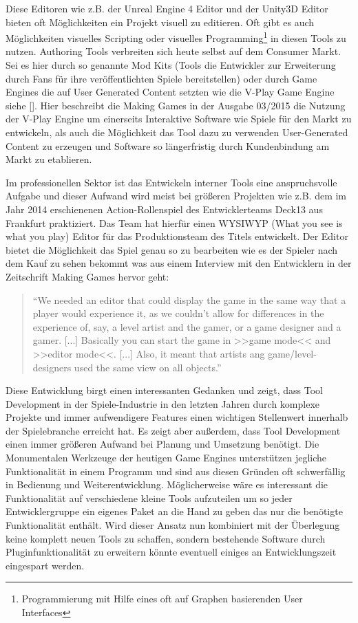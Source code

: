 \documentclass[pagesize, paper=a4, fontsize=12pt, titlepage=true, headings=small, headnosepline, abstractoff, liststotoc, nochapterprefix, plainheadsepline, twoside]{scrreprt}
\begin{document}
Diese Editoren wie z.B. der Unreal Engine 4 Editor und der Unity3D Editor bieten oft Möglichkeiten ein Projekt visuell zu editieren. Oft gibt es auch Möglichkeiten visuelles Scripting oder visuelles Programming\footnote{Programmierung mit Hilfe eines oft auf Graphen basierenden User Interfaces} in diesen Tools zu nutzen. Authoring Tools verbreiten sich heute selbst auf dem Consumer Markt. Sei es hier durch so genannte Mod Kits (Tools die Entwickler zur Erweiterung durch Fans für ihre veröffentlichten Spiele bereitstellen) oder durch Game Engines die auf User Generated Content setzten wie die V-Play Game Engine siehe []. Hier beschreibt die Making Games in der Ausgabe 03/2015 die Nutzung der V-Play Engine um einerseits Interaktive Software wie Spiele für den Markt zu entwickeln, als auch die Möglichkeit das Tool dazu zu verwenden User-Generated Content zu erzeugen und Software so längerfristig durch Kundenbindung am Markt zu etablieren.

Im professionellen Sektor ist das Entwickeln interner Tools eine anspruchsvolle Aufgabe und dieser Aufwand wird meist bei größeren Projekten wie z.B. dem im Jahr 2014 erschienenen Action-Rollenspiel  des Entwicklerteams Deck13 aus Frankfurt praktiziert. Das Team hat hierfür einen WYSIWYP (What you see is what you play) Editor für das Produktionsteam des Titels entwickelt. Der Editor bietet die Möglichkeit das Spiel genau so zu bearbeiten wie es der Spieler nach dem Kauf zu sehen bekommt was aus einem Interview mit den Entwicklern in der Zeitschrift Making Games hervor geht:
\begin{quote}
“We needed an editor that could display the game in the same way that a player would experience it, as we couldn’t allow for differences in the experience of, say, a level artist and the gamer, or a game designer and a gamer. [...] Basically you can start the game in >>game mode<< and >>editor mode<<.  [...] Also, it meant that artists ang game/level-designers used the same view on all objects.”

\end{quote}
Diese Entwicklung birgt einen interessanten Gedanken und zeigt, dass Tool Development in der Spiele-Industrie in den letzten Jahren durch komplexe Projekte und immer aufwendigere Features einen wichtigen Stellenwert innerhalb der Spielebranche erreicht hat. Es zeigt aber außerdem, dass Tool Development einen immer größeren Aufwand bei Planung und Umsetzung benötigt. Die Monumentalen Werkzeuge der heutigen Game Engines unterstützen jegliche Funktionalität in einem Programm und sind aus diesen Gründen oft schwerfällig in Bedienung und Weiterentwicklung. Möglicherweise wäre es interessant die Funktionalität auf verschiedene kleine Tools aufzuteilen um so jeder Entwicklergruppe ein eigenes Paket an die Hand zu geben das nur die benötigte Funktionalität enthält. Wird dieser Ansatz nun kombiniert mit der Überlegung keine komplett neuen Tools zu schaffen, sondern bestehende Software durch Pluginfunktionalität zu erweitern könnte eventuell einiges an Entwicklungszeit eingespart werden.
\end{document}
